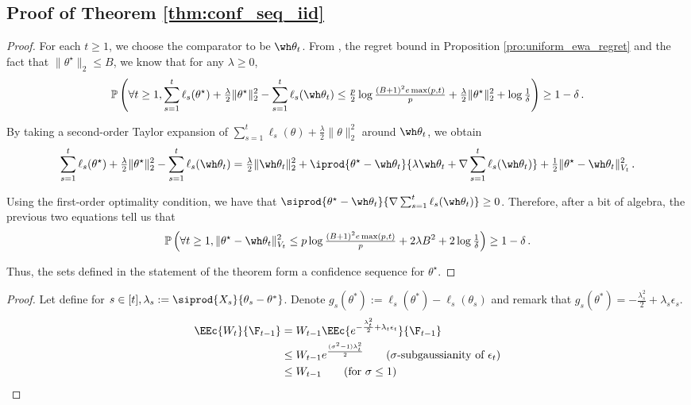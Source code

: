 
\subsection{Proof of Theorem \ref{thm:conf_seq_iid}}

\begin{proof}
For each $t \geq 1$, we choose the comparator to be $\wh\theta_t$. From , the regret bound in Proposition \ref{pro:uniform_ewa_regret} and the fact that $\|\theta^{\star}\|_2 \leq B$, we know that for any $\lambda \geq 0$,
\begin{equation*}
\mathbb{P}\left(\forall t \geq 1, \sum_{s=1}^{t}\ell_s(\theta^{\star}) + \tfrac{\lambda}{2}\|\theta^{\star}\|_2^2 - \sum_{s=1}^{t}\ell_s(\wh\theta_t) \leq \tfrac{p}{2}\log\tfrac{(B+1)^2e\max(p, t)}{p} + \tfrac{\lambda}{2}\|\theta^{\star}\|_2^2 + \log\tfrac{1}{\delta}\right) \geq 1 - \delta\,.
\end{equation*}

By taking a second-order Taylor expansion of $\sum_{s=1}^{t}\ell_s(\theta) + \frac{\lambda}{2}\|\theta\|_2^2$ around $\wh\theta_t$, we obtain
\begin{equation*}
\sum_{s=1}^{t}\ell_s(\theta^{\star}) + \tfrac{\lambda}{2}\|\theta^{\star}\|_2^2 - \sum_{s=1}^{t}\ell_s(\wh\theta_t) = \tfrac{\lambda}{2}\|\wh\theta_t\|_2^2 + \iprod{\theta^{\star} - \wh\theta_t}{\lambda \wh\theta_t + \nabla\sum_{s=1}^{t}\ell_s(\wh\theta_t)} + \tfrac{1}{2}\|\theta^{\star} - \wh\theta_t\|_{V_t}^2\,.
\end{equation*}

Using the first-order optimality condition, we have that $\siprod{\theta^{\star} - \wh\theta_t}{\nabla\sum_{s=1}^{t}\ell_s(\wh\theta_t)} \geq 0$. Therefore, after a bit of algebra, the previous two equations tell us that
\begin{equation*}
\mathbb{P}\left(\forall t \geq 1, \|\theta^{\star} - \wh\theta_t\|_{V_t}^2 \leq p\log\tfrac{(B+1)^2e\max(p,t)}{p} + 2\lambda B^2 + 2\log\tfrac{1}{\delta}\right) \geq 1 - \delta\,.
\end{equation*}

Thus, the sets defined in the statement of the theorem form a confidence sequence for $\theta^{\star}$.
\end{proof}



\begin{proof}
    Let define for $s \in[t], \lambda_s := \siprod{X_s}{\theta_s-\theta^*}$. Denote $g_s(\theta^*):=\ell_s(\theta^*)-\ell_s(\theta_s)$ and remark that $g_s(\theta^*)=-\frac{\lambda_s^2}{2}+\lambda_s\epsilon_s.$
    \begin{align*}
        \EEc{W_t}{\F_{t-1}}&= W_{t-1}\EEc{e^{-\frac{\lambda_t^2}{2}+\lambda_t\epsilon_t}}{\F_{t-1}}\\ 
        &\leq W_{t-1}e^{\frac{(\sigma^2-1)\lambda_t^2}{2}} \qquad \text{($\sigma$-subgaussianity of } \epsilon_t)\\
        &\leq W_{t-1} \qquad \text{(for } \sigma\leq 1) 
    \end{align*}
\end{proof}
